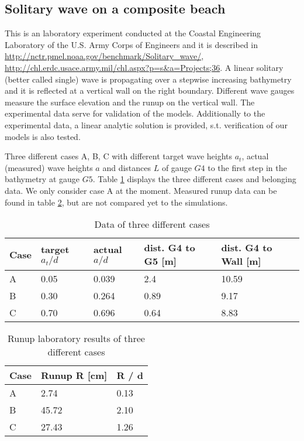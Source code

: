 \subsection{Solitary wave on a composite beach} \label{sec:B_compositebeach}
This is an laboratory experiment conducted at the Coastal Engineering Laboratory of the U.S. Army Corps of Engineers and it is described in \url{http://nctr.pmel.noaa.gov/benchmark/Solitary_wave/}, \url{http://chl.erdc.usace.army.mil/chl.aspx?p=s&a=Projects;36}. 
A linear solitary (better called single) wave is propagating over a stepwise increasing bathymetry and it is reflected at a vertical wall on the right boundary. Different wave gauges measure the surface elevation and the runup on the vertical wall. 
The experimental data serve for validation of the models. Additionally to the experimental data, a linear analytic solution is provided, s.t. verification of our models is also tested.

Three different cases A, B, C with different target wave heights $a_t$, actual (measured) wave heights $a$ and distances $L$ of gauge $G4$ to the first step in the bathymetry at gauge $G5$. Table \ref{tab:compositebeach_cases} displays the three different cases and belonging data. We only consider case A at the moment. Measured runup data can be found in table \ref{tab:compositebeach_runup}, but are not compared yet to the simulations.

\begin{table}[htbp]
\begin{tabular}{lllll}
\textbf{Case} & \textbf{target $a_t / d$} & \textbf{actual $a / d$} & \textbf{dist. G4 to G5 [m]} & \textbf{dist. G4 to Wall [m]}  \\
\toprule
A       &     0.05   & 0.039    &   2.4   &  10.59     \\
B       &     0.30   & 0.264    &   0.89  &   9.17     \\
C       &     0.70   & 0.696    &    0.64  &   8.83    \\
\bottomrule
\end{tabular}
\caption{Data of three different cases}
\label{tab:compositebeach_cases}
\end{table}


\begin{table}[htbp]
\begin{tabular}{lll}
\textbf{Case} & \textbf{Runup R [cm]} & \textbf{R / d} \\
\toprule
A       &        2.74  &  0.13 \\
B       &       45.72  &  2.10 \\
C       &       27.43  &  1.26 \\
\bottomrule
\end{tabular}
\caption{Runup laboratory results of three different cases}
\label{tab:compositebeach_runup}
\end{table}


